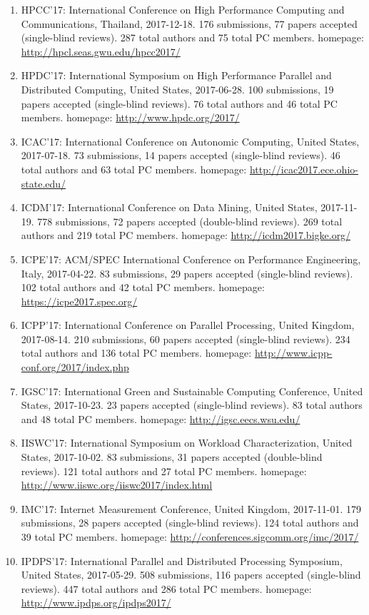 \documentclass[10pt,letterpaper]{article}
\begin{document}
\begin{enumerate}
\item HPCC'17: International Conference on High Performance Computing and Communications, Thailand, 2017-12-18. 176  submissions, 77 papers accepted (single-blind reviews). 287 total authors and 75 total PC members. homepage: \url{http://hpcl.seas.gwu.edu/hpcc2017/}
\item HPDC'17: International Symposium on High Performance Parallel and Distributed Computing, United States, 2017-06-28. 100  submissions, 19 papers accepted (single-blind reviews). 76 total authors and 46 total PC members. homepage: \url{http://www.hpdc.org/2017/}
\item ICAC'17: International Conference on Autonomic Computing, United States, 2017-07-18. 73  submissions, 14 papers accepted (single-blind reviews). 46 total authors and 63 total PC members. homepage: \url{http://icac2017.ece.ohio-state.edu/}
\item ICDM'17: International Conference on Data Mining, United States, 2017-11-19. 778  submissions, 72 papers accepted (double-blind reviews). 269 total authors and 219 total PC members. homepage: \url{http://icdm2017.bigke.org/}
\item ICPE'17: ACM/SPEC International Conference on Performance Engineering, Italy, 2017-04-22. 83  submissions, 29 papers accepted (single-blind reviews). 102 total authors and 42 total PC members. homepage: \url{https://icpe2017.spec.org/}
\item ICPP'17: International Conference on Parallel Processing, United Kingdom, 2017-08-14. 210  submissions, 60 papers accepted (single-blind reviews). 234 total authors and 136 total PC members. homepage: \url{http://www.icpp-conf.org/2017/index.php}
\item IGSC'17: International Green and Sustainable Computing Conference, United States, 2017-10-23. 23 papers accepted (single-blind reviews). 83 total authors and 48 total PC members. homepage: \url{http://igsc.eecs.wsu.edu/}
\item IISWC'17: International Symposium on Workload Characterization, United States, 2017-10-02. 83  submissions, 31 papers accepted (double-blind reviews). 121 total authors and 27 total PC members. homepage: \url{http://www.iiswc.org/iiswc2017/index.html}
\item IMC'17: Internet Measurement Conference, United Kingdom, 2017-11-01. 179  submissions, 28 papers accepted (single-blind reviews). 124 total authors and 39 total PC members. homepage: \url{http://conferences.sigcomm.org/imc/2017/}
\item IPDPS'17: International Parallel and Distributed Processing Symposium, United States, 2017-05-29. 508  submissions, 116 papers accepted (single-blind reviews). 447 total authors and 286 total PC members. homepage: \url{http://www.ipdps.org/ipdps2017/}

\end{enumerate}
\end{document}
